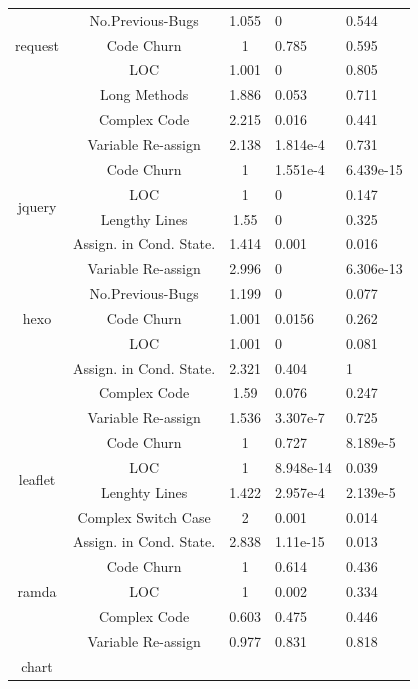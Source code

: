 \documentclass[smallcondensed]{svjour3}
\begin{document}
\begin{table}[t]
\begin{tabular}{c|c|c|p{1.1cm}|p{1.3cm}}
		\multirow{3}{*}{request}
		& No.Previous-Bugs & 1.055 & 0 & 0.544 \\ \cline{2-5}
		& Code Churn & 1 & 0.785 & 0.595 \\ \cline{2-5}
		& LOC & 1.001 & 0 & 0.805 \\ \cline{2-5}
		& Long Methods & 1.886 & 0.053 & 0.711 \\ \cline{2-5}
		& Complex Code & 2.215 & 0.016 & 0.441 \\ \cline{2-5}
		& Variable Re-assign & 2.138 & 1.814e-4 & 0.731 \\ \hline
		\multirow{4}{*}{jquery}
		& Code Churn & 1 & 1.551e-4 & 6.439e-15 \\ \cline{2-5}
		& LOC & 1 & 0 & 0.147 \\ \cline{2-5}
		& Lengthy Lines & 1.55 & 0 & 0.325 \\ \cline{2-5}
		& Assign. in Cond. State. & 1.414 & 0.001 & 0.016 \\ \cline{2-5}
		& Variable Re-assign & 2.996 & 0 & 6.306e-13 \\ \hline
		\multirow{3}{*}{hexo}
		& No.Previous-Bugs & 1.199 & 0 & 0.077 \\ \cline{2-5}
		& Code Churn & 1.001 & 0.0156 & 0.262 \\ \cline{2-5}
		& LOC & 1.001 & 0 & 0.081 \\ \cline{2-5}
		& Assign. in Cond. State. & 2.321 & 0.404 & 1 \\ \cline{2-5}
		& Complex Code & 1.59 & 0.076 & 0.247 \\ \cline{2-5}
		& Variable Re-assign & 1.536 & 3.307e-7 & 0.725 \\ \hline
		\multirow{4}{*}{leaflet}
		& Code Churn & 1 & 0.727 & 8.189e-5 \\ \cline{2-5}
		& LOC & 1 & 8.948e-14 & 0.039 \\ \cline{2-5}
		& Lenghty Lines & 1.422 & 2.957e-4 & 2.139e-5 \\ \cline{2-5}
		& Complex Switch Case & 2 & 0.001 & 0.014 \\ \cline{2-5}
		& Assign. in Cond. State. & 2.838 & 1.11e-15 & 0.013 \\ \hline
		\multirow{3}{*}{ramda}
		& Code Churn & 1 & 0.614 & 0.436 \\ \cline{2-5}
		& LOC & 1 & 0.002 & 0.334 \\ \cline{2-5}
		& Complex Code & 0.603 & 0.475 & 0.446 \\ \cline{2-5}
		& Variable Re-assign & 0.977 & 0.831 & 0.818 \\ \hline
		\multirow{4}{*}{chart}

\end{tabular}
\end{table}
\end{document}
